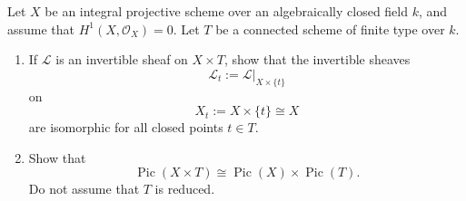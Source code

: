 \documentclass[12pt]{article}
\begin{document}
\begin{exercise}
    Let $X$ be an integral projective scheme over an algebraically closed field $k$, and assume that $H^1(X,\mathcal O_X)=0$. Let $T$ be a connected scheme of finite type over $k$.
    \begin{enumerate}
        \item If $\mathcal L$ is an invertible sheaf on $X\times T$, show that the invertible sheaves
              \[
                  \mathcal L_t:=\mathcal L|_{X\times \{t\}}
              \]
              on
              \[
                  X_t:=X\times \{t\}\cong X
              \]
              are isomorphic for all closed points $t\in T$.

        \item Show that
              \[
                  \operatorname{Pic}(X\times T)\cong \operatorname{Pic}(X)\times \operatorname{Pic}(T).
              \]
              Do not assume that $T$ is reduced.
    \end{enumerate}
\end{exercise}
\end{document}
